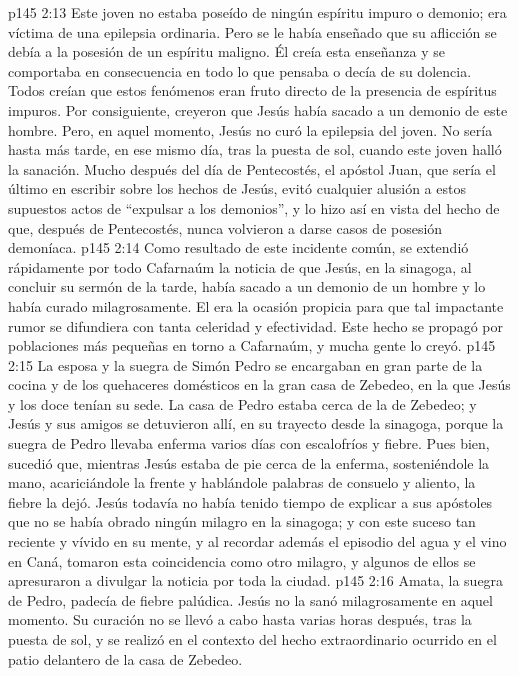 \vs p145 2:13 Este joven no estaba poseído de ningún espíritu impuro o demonio; era víctima de una epilepsia ordinaria. Pero se le había enseñado que su aflicción se debía a la posesión de un espíritu maligno. Él creía esta enseñanza y se comportaba en consecuencia en todo lo que pensaba o decía de su dolencia. Todos creían que estos fenómenos eran fruto directo de la presencia de espíritus impuros. Por consiguiente, creyeron que Jesús había sacado a un demonio de este hombre. Pero, en aquel momento, Jesús no curó la epilepsia del joven. No sería hasta más tarde, en ese mismo día, tras la puesta de sol, cuando este joven halló la sanación. Mucho después del día de Pentecostés, el apóstol Juan, que sería el último en escribir sobre los hechos de Jesús, evitó cualquier alusión a estos supuestos actos de “expulsar a los demonios”, y lo hizo así en vista del hecho de que, después de Pentecostés, nunca volvieron a darse casos de posesión demoníaca.
\vs p145 2:14 Como resultado de este incidente común, se extendió rápidamente por todo Cafarnaúm la noticia de que Jesús, en la sinagoga, al concluir su sermón de la tarde, había sacado a un demonio de un hombre y lo había curado milagrosamente. El  era la ocasión propicia para que tal impactante rumor se difundiera con tanta celeridad y efectividad. Este hecho se propagó por poblaciones más pequeñas en torno a Cafarnaúm, y mucha gente lo creyó.
\vs p145 2:15 \pc La esposa y la suegra de Simón Pedro se encargaban en gran parte de la cocina y de los quehaceres domésticos en la gran casa de Zebedeo, en la que Jesús y los doce tenían su sede. La casa de Pedro estaba cerca de la de Zebedeo; y Jesús y sus amigos se detuvieron allí, en su trayecto desde la sinagoga, porque la suegra de Pedro llevaba enferma varios días con escalofríos y fiebre. Pues bien, sucedió que, mientras Jesús estaba de pie cerca de la enferma, sosteniéndole la mano, acariciándole la frente y hablándole palabras de consuelo y aliento, la fiebre la dejó. Jesús todavía no había tenido tiempo de explicar a sus apóstoles que no se había obrado ningún milagro en la sinagoga; y con este suceso tan reciente y vívido en su mente, y al recordar además el episodio del agua y el vino en Caná, tomaron esta coincidencia como otro milagro, y algunos de ellos se apresuraron a divulgar la noticia por toda la ciudad.
\vs p145 2:16 Amata, la suegra de Pedro, padecía de fiebre palúdica. Jesús no la sanó milagrosamente en aquel momento. Su curación no se llevó a cabo hasta varias horas después, tras la puesta de sol, y se realizó en el contexto del hecho extraordinario ocurrido en el patio delantero de la casa de Zebedeo.
